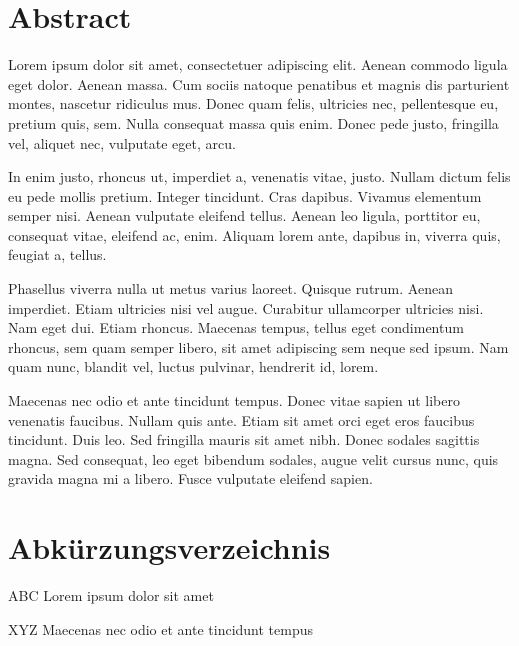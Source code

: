 \documentclass[ngerman, 11pt, a4paper]{article}
\begin{document}

\section*{Abstract}

Lorem ipsum dolor sit amet, consectetuer adipiscing elit. Aenean commodo ligula eget dolor. Aenean massa. Cum sociis natoque penatibus et magnis dis parturient montes, nascetur ridiculus mus. Donec quam felis, ultricies nec, pellentesque eu, pretium quis, sem. Nulla consequat massa quis enim. Donec pede justo, fringilla vel, aliquet nec, vulputate eget, arcu.

In enim justo, rhoncus ut, imperdiet a, venenatis vitae, justo. Nullam dictum felis eu pede mollis pretium. Integer tincidunt. Cras dapibus. Vivamus elementum semper nisi. Aenean vulputate eleifend tellus. Aenean leo ligula, porttitor eu, consequat vitae, eleifend ac, enim. Aliquam lorem ante, dapibus in, viverra quis, feugiat a, tellus.

Phasellus viverra nulla ut metus varius laoreet. Quisque rutrum. Aenean imperdiet. Etiam ultricies nisi vel augue. Curabitur ullamcorper ultricies nisi. Nam eget dui. Etiam rhoncus. Maecenas tempus, tellus eget condimentum rhoncus, sem quam semper libero, sit amet adipiscing sem neque sed ipsum. Nam quam nunc, blandit vel, luctus pulvinar, hendrerit id, lorem.

Maecenas nec odio et ante tincidunt tempus. Donec vitae sapien ut libero venenatis faucibus. Nullam quis ante. Etiam sit amet orci eget eros faucibus tincidunt. Duis leo. Sed fringilla mauris sit amet nibh. Donec sodales sagittis magna. Sed consequat, leo eget bibendum sodales, augue velit cursus nunc, quis gravida magna mi a libero. Fusce vulputate eleifend sapien.

\pagebreak
\renewcommand{\contentsname}{Inhaltsverzeichnis}
\tableofcontents
\pagebreak

\listoffigures
\pagebreak

\section*{Abkürzungsverzeichnis}

\begin{abbrv}

\item[ABC] Lorem ipsum dolor sit amet
\item[XYZ] Maecenas nec odio et ante tincidunt tempus
 
\end{abbrv}
\pagebreak
\end{document}
